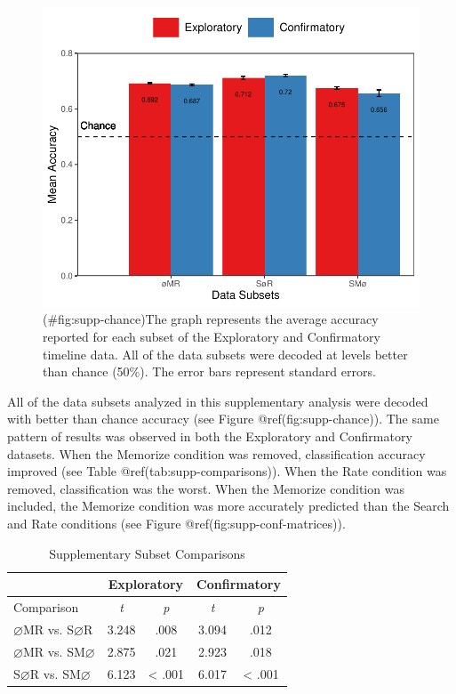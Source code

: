 \begin{appendix}
\begin{figure}
\centering
\includegraphics{supplementary_analysis/supp_subset_chance.pdf}
\caption{(\#fig:supp-chance)The graph represents the average accuracy
reported for each subset of the Exploratory and Confirmatory timeline
data. All of the data subsets were decoded at levels better than chance
(50\%). The error bars represent standard errors.}
\end{figure}

All of the data subsets analyzed in this supplementary analysis were
decoded with better than chance accuracy (see Figure
@ref(fig:supp-chance)). The same pattern of results was observed in both
the Exploratory and Confirmatory datasets. When the Memorize condition
was removed, classification accuracy improved (see Table
@ref(tab:supp-comparisons)). When the Rate condition was removed,
classification was the worst. When the Memorize condition was included,
the Memorize condition was more accurately predicted than the Search and
Rate conditions (see Figure @ref(fig:supp-conf-matrices)).

\begin{table}[!h]
    \centering
    \caption{Supplementary Subset Comparisons}
    \label{tab:supp-comparisons}
    \begin{tabular}{l c c c c}
         & \multicolumn{2}{c}{Exploratory} & \multicolumn{2}{c}{Confirmatory} \\
        \hline
        Comparison & \textit{t} & \multicolumn{1}{c|}{\textit{p}} & \textit{t} & \textit{p} \\
        \hline
        $\varnothing$MR vs. S$\varnothing$R & 3.248 & \multicolumn{1}{c|}{.008} & 3.094 & .012 \\
        $\varnothing$MR vs. SM$\varnothing$ & 2.875 & \multicolumn{1}{c|}{.021} & 2.923 & .018 \\
        S$\varnothing$R vs. SM$\varnothing$ & 6.123 & \multicolumn{1}{c|}{< .001} & 6.017 & < .001 \\
        \hline
    \end{tabular}
\end{table}


\end{appendix}
